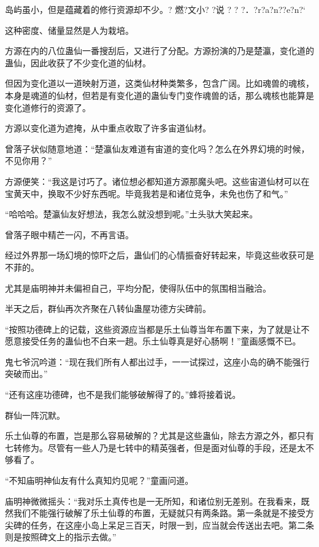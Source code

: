 
\begin{this_body}

岛屿虽小，但是蕴藏着的修行资源却不少。?  燃?文小? ?说  ? ? ?．?r?a?n??e?n?`

这种密度、储量显然是人为栽培。

方源在内的八位蛊仙一番搜刮后，又进行了分配。方源扮演的乃是楚瀛，变化道的蛊仙，因此收获了不少变化道的仙材。

但因为变化道以一道映射万道，这类仙材种类繁多，包含广阔。比如魂兽的魂核，本身是魂道的仙材，但若是有变化道的蛊仙专门变作魂兽的话，那么魂核也能算是变化道修行的资源了。

方源以变化道为遮掩，从中重点收取了许多宙道仙材。

曾落子状似随意地道：“楚瀛仙友难道有宙道的变化吗？怎么在外界幻境的时候，不见你用？”

方源便笑：“我这是讨巧了。诸位想必都知道方源那魔头吧。这些宙道仙材可以在宝黄天中，换取不少好东西呢。毕竟我若是和诸位竞争，未免也伤了和气。”

“哈哈哈。楚瀛仙友好想法，我怎么就没想到呢。”土头驮大笑起来。

曾落子眼中精芒一闪，不再言语。

经过外界那一场幻境的惊吓之后，蛊仙们的心情振奋好转起来，毕竟这些收获可是不菲的。

尤其是庙明神并未偏袒自己，平均分配，使得队伍中的氛围相当融洽。

半天之后，群仙再次齐聚在八转仙蛊屋功德方尖碑前。

“按照功德碑上的记载，这些资源应当都是乐土仙尊当年布置下来，为了就是让不愿意接受任务的蛊仙也不白来一趟。乐土仙尊真是好心肠啊！”童画感慨不已。

鬼七爷沉吟道：“现在我们所有人都出过手，一一试探过，这座小岛的确不能强行突破而出。”

“还有这座功德碑，也不是我们能够破解得了的。”蜂将接着说。

群仙一阵沉默。

乐土仙尊的布置，岂是那么容易破解的？尤其是这些蛊仙，除去方源之外，都只有七转修为。尽管有一些人乃是七转中的精英强者，但是面对仙尊的手段，还是太不够看了。

“不知庙明神仙友有什么真知灼见呢？”童画问道。

庙明神微微摇头：“我对乐土真传也是一无所知，和诸位别无差别。在我看来，既然我们不能强行破解了乐土仙尊的布置，无疑就只有两条路。第一条就是不接受方尖碑的任务，在这座小岛上呆足三百天，时限一到，应当就会传送出去吧。第二条则是按照碑文上的指示去做。”


\end{this_body}

